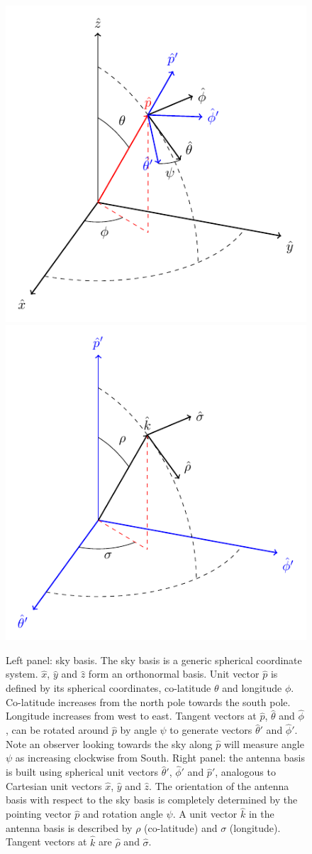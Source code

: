 \documentclass[a4paper,11pt]{article}
\begin{document}
\begin{figure}
	\centering
	\includegraphics[width=0.47\linewidth]{figures/sky_basis}	
	\includegraphics[width=0.47\linewidth]{figures/antenna_basis}
	\caption{Left panel: sky basis. The sky basis is a generic spherical coordinate system. $\hat{x}$, $\hat{y}$ and $\hat{z}$ form an orthonormal basis. Unit vector $\hat{p}$ is defined by its spherical coordinates, co-latitude $\theta$ and longitude $\phi$. Co-latitude increases from the north pole towards the south pole. Longitude increases from west to east. Tangent vectors at $\hat{p}$, $\hat{\theta}$ and $\hat{\phi}$, can be rotated around $\hat{p}$ by angle $\psi$ to generate vectors $\hat{\theta}'$ and $\hat{\phi}'$. Note an observer looking towards the sky along $\hat{p}$ will measure angle $\psi$ as increasing clockwise from South. Right panel: the antenna basis is built using spherical unit vectors $\hat{\theta}'$, $\hat{\phi}'$ and $\hat{p}'$, analogous to Cartesian unit vectors $\hat{x}$, $\hat{y}$ and $\hat{z}$. The orientation of the antenna basis with respect to the sky basis is completely determined by the pointing vector $\hat{p}$ and rotation angle $\psi$. A unit vector $\hat{k}$ in the antenna basis is described by $\rho$ (co-latitude) and $\sigma$ (longitude). Tangent vectors at $\hat{k}$ are $\hat{\rho}$ and $\hat{\sigma}$. }
	\label{fig::sky_basis} 
\end{figure}
\end{document}
